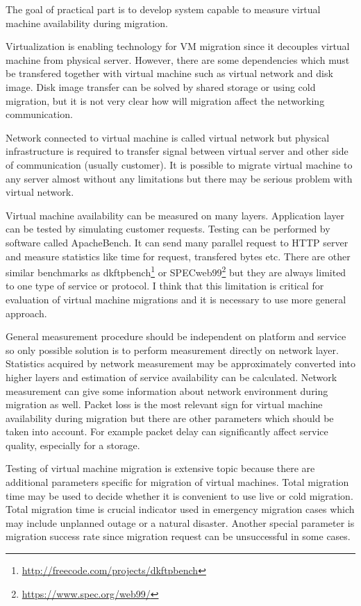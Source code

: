 
The goal of practical part is to develop system capable to measure virtual machine availability during migration. 

Virtualization is enabling technology for \Ac{VM} migration since it decouples virtual machine from physical server. However, there are some dependencies which must be transfered together with virtual machine such as virtual network and disk image. Disk image transfer can be solved by shared storage or using cold migration, but it is not very clear how will migration affect the networking communication.

Network connected to virtual machine is called virtual network but physical infrastructure is required to transfer signal between virtual server and other side of communication (usually customer). It is possible to migrate virtual machine to any server almost without any limitations but there may be serious problem with virtual network. 

Virtual machine availability can be measured on many layers. Application layer can be tested by simulating customer requests. Testing can be performed by software called ApacheBench. It can send many parallel request to \Ac{HTTP} server and measure statistics like time for request, transfered bytes etc. 
There are other similar benchmarks as dkftpbench\footnote{\url{http://freecode.com/projects/dkftpbench}} or SPECweb99\footnote{\url{https://www.spec.org/web99/}} but they are always limited to one type of service or protocol. I think that this limitation is critical for evaluation of virtual machine migrations and it is necessary to use more general approach.

General measurement procedure should be independent on platform and service so only possible solution is to perform measurement directly on network layer. Statistics acquired by network measurement may be approximately converted into higher layers and estimation of service availability can be calculated. Network measurement can give some information about network environment during migration as well. Packet loss is the most relevant sign for virtual machine availability during migration but there are other parameters which should be taken into account. For example packet delay can significantly affect service quality, especially for a storage.

Testing of virtual machine migration is extensive topic because there are additional parameters specific for migration of virtual machines. Total migration time may be used to decide whether it is convenient to use live or cold migration. Total migration time is crucial indicator used in emergency migration cases which may include unplanned outage or a natural disaster. Another special parameter is migration success rate since migration request can be unsuccessful in some cases.

